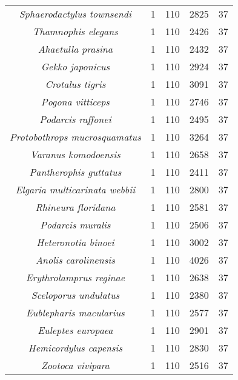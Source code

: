 \begin{longtable}[c]{|c|c|c|c|c|}
\textit{Sphaerodactylus townsendi}     & 1 & 110 & 2825 & 37 \\
\textit{Thamnophis elegans}            & 1 & 110 & 2426 & 37 \\
\textit{Ahaetulla prasina}             & 1 & 110 & 2432 & 37 \\
\textit{Gekko japonicus}               & 1 & 110 & 2924 & 37 \\
\textit{Crotalus tigris}               & 1 & 110 & 3091 & 37 \\
\textit{Pogona vitticeps}              & 1 & 110 & 2746 & 37 \\
\textit{Podarcis raffonei}             & 1 & 110 & 2495 & 37 \\
\textit{Protobothrops mucrosquamatus}  & 1 & 110 & 3264 & 37 \\
\textit{Varanus komodoensis}           & 1 & 110 & 2658 & 37 \\
\textit{Pantherophis guttatus}         & 1 & 110 & 2411 & 37 \\
\textit{Elgaria multicarinata webbii}  & 1 & 110 & 2800 & 37 \\
\textit{Rhineura floridana}            & 1 & 110 & 2581 & 37 \\
\textit{Podarcis muralis}              & 1 & 110 & 2506 & 37 \\
\textit{Heteronotia binoei}            & 1 & 110 & 3002 & 37 \\
\textit{Anolis carolinensis}           & 1 & 110 & 4026 & 37 \\
\textit{Erythrolamprus reginae}        & 1 & 110 & 2638 & 37 \\
\textit{Sceloporus undulatus}          & 1 & 110 & 2380 & 37 \\
\textit{Eublepharis macularius}        & 1 & 110 & 2577 & 37 \\
\textit{Euleptes europaea}             & 1 & 110 & 2901 & 37 \\
\textit{Hemicordylus capensis}         & 1 & 110 & 2830 & 37 \\
\textit{Zootoca vivipara}              & 1 & 110 & 2516 & 37 \\ \hline
\end{longtable}


